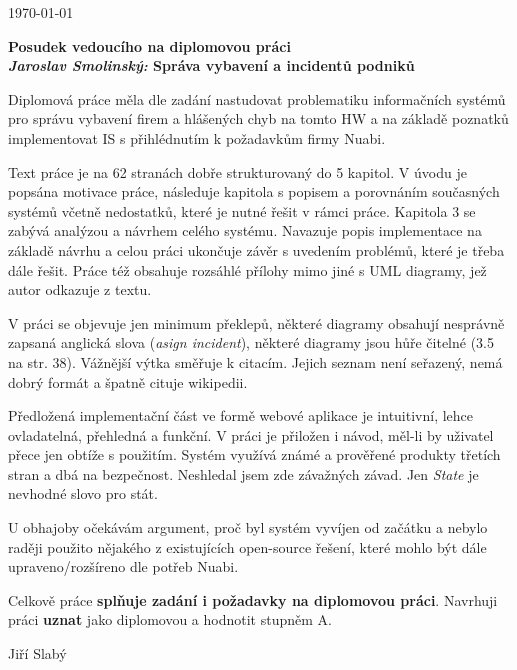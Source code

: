\documentclass{article}
\begin{document}
\begin{flushright}
\today
\end{flushright}
\begin{center}
\Large\textbf{Posudek vedoucího na diplomovou práci \\
\normalsize%
\textit{Jaroslav Smolinský:} Správa vybavení a incidentů podniků}
\end{center}

Diplomová práce měla dle zadání nastudovat problematiku informačních systémů
pro správu vybavení firem a hlášených chyb na tomto HW a na základě poznatků
implementovat IS s přihlédnutím k požadavkům firmy Nuabi.

Text práce je na 62 stranách dobře strukturovaný do 5 kapitol. V úvodu je
popsána motivace práce, následuje kapitola s popisem a porovnáním současných
systémů včetně nedostatků, které je nutné řešit v rámci práce. Kapitola 3
se zabývá analýzou a návrhem celého systému. Navazuje popis implementace na
základě návrhu a celou práci ukončuje závěr s uvedením problémů, které je
třeba dále řešit. Práce též obsahuje rozsáhlé přílohy mimo jiné s UML
diagramy, jež autor odkazuje z textu.

V práci se objevuje jen minimum překlepů, některé diagramy obsahují nesprávně
zapsaná anglická slova (\emph{asign incident}), některé diagramy jsou hůře
čitelné (3.5 na str. 38). Vážnější výtka směřuje k citacím. Jejich seznam není
seřazený, nemá dobrý formát a špatně cituje wikipedii.

Předložená implementační část ve formě webové aplikace je intuitivní, lehce
ovladatelná, přehledná a funkční. V práci je přiložen i návod, měl-li by
uživatel přece jen obtíže s použitím. Systém využívá známé a prověřené
produkty třetích stran a dbá na bezpečnost. Neshledal jsem zde závažných
závad. Jen \emph{State} je nevhodné slovo pro stát.

U obhajoby očekávám argument, proč byl systém vyvíjen od začátku a nebylo
raději použito nějakého z existujících open-source řešení, které mohlo být
dále upraveno/rozšíreno dle potřeb Nuabi.

Celkově práce \textbf{splňuje zadání i požadavky na diplomovou práci}.
Navrhuji práci \textbf{uznat} jako diplomovou a hodnotit stupněm A.

\begin{flushright}
Jiří Slabý
\end{flushright}
\end{document}
